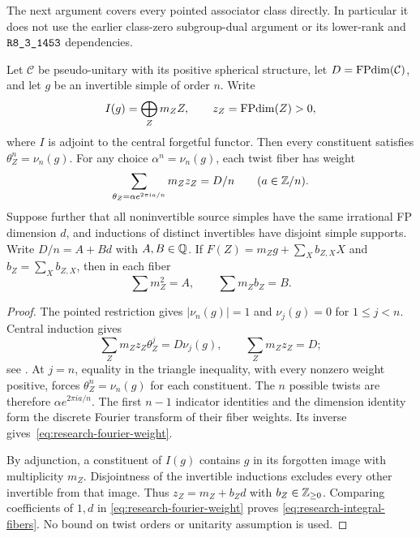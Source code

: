 The next argument covers every pointed associator class directly.
In particular it does not use the earlier class-zero subgroup-dual
argument or its lower-rank and $\sha{R8_3_1453}$ dependencies.

\begin{lemma}
\label{lem:research-pointed-fourier}
Let $\mathcal C$ be pseudo-unitary with its positive spherical
structure, let $D=\operatorname{FPdim}(\mathcal C)$, and let $g$ be an invertible
simple of order $n$.  Write
\[
 I(g)=\bigoplus_Z m_Z Z,\qquad z_Z=\operatorname{FPdim}(Z)>0,
\]
where $I$ is adjoint to the central forgetful functor.  Then every
constituent satisfies $\theta_Z^n=\nu_n(g)$.  For any choice
$\alpha^n=\nu_n(g)$, each twist fiber has weight
\begin{equation}\label{eq:research-fourier-weight}
 \sum_{\theta_Z=\alpha e^{2\pi ia/n}}m_Zz_Z=D/n
 \qquad(a\in\mathbb Z/n).
\end{equation}
Suppose further that all noninvertible source simples have the same
irrational FP dimension $d$, and inductions of distinct invertibles
have disjoint simple supports.  Write $D/n=A+Bd$ with $A,B\in\mathbb Q$.
If $F(Z)=m_Zg+\sum_X b_{Z,X}X$ and $b_Z=\sum_Xb_{Z,X}$,
then in each fiber
\begin{equation}\label{eq:research-integral-fibers}
 \sum m_Z^2=A,\qquad \sum m_Zb_Z=B.
\end{equation}
\end{lemma}
\begin{proof}
The pointed restriction gives $|\nu_n(g)|=1$ and
$\nu_j(g)=0$ for $1\leq j<n$.  Central induction gives
\[
 \sum_Zm_Zz_Z\theta_Z^j=D\nu_j(g),\qquad
 \sum_Zm_Zz_Z=D;
\]
see \cite[Theorem~4.1 and the calculation preceding Lemma~9.3]{NgIndicators}.
At $j=n$, equality in the triangle inequality, with every nonzero
weight positive, forces $\theta_Z^n=\nu_n(g)$ for each constituent.
The $n$ possible twists are therefore $\alpha e^{2\pi ia/n}$.
The first $n-1$ indicator identities and the dimension identity form
the discrete Fourier transform of their fiber weights.  Its inverse
gives~\eqref{eq:research-fourier-weight}.

By adjunction, a constituent of $I(g)$ contains $g$ in its forgotten
image with multiplicity $m_Z$.  Disjointness of the invertible
inductions excludes every other invertible from that image.  Thus
$z_Z=m_Z+b_Zd$ with $b_Z\in\mathbb Z_{\ge0}$.
Comparing coefficients of $1,d$ in
\eqref{eq:research-fourier-weight} proves
\eqref{eq:research-integral-fibers}.  No bound on twist orders or
unitarity assumption is used.
\end{proof}

